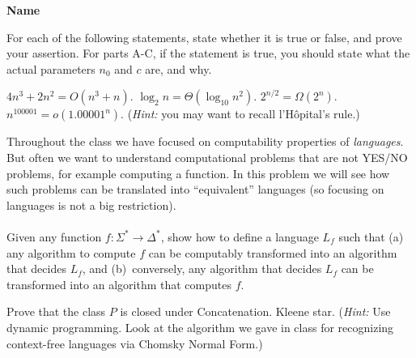 \documentclass[letterpaper, ps]{cs121}
\begin{document}




\vspace{3mm}
\begin{center} \bf{Name} \end{center}


 For each of the following statements, state whether it is true or false, and prove your assertion. 
For parts A-C, if the statement is true, you should state what the actual parameters $n_0$ and $c$ are, and why.

\subproblem $4n^3+2n^2=O(n^3+n)$.
\subproblem $\log_2 n = \Theta(\log_{10} n^2)$.
\subproblem $2^{n/2} = \Omega(2^n)$.
\subproblem $n^{100001}=o(1.00001^n)$. (\emph{Hint:} you may want to recall  l'H\^opital's rule.)


 Throughout the class we have focused on computability
properties of \emph{languages}.  But often we want to understand
computational problems that are not YES/NO problems, for example
computing a function.  In this problem we will see how such
problems can be translated into ``equivalent'' languages (so
focusing on languages is not a big restriction). \\
\\Given any function $f: \Sigma^* \rightarrow
\Delta^*$, show how to define a language $L_f$ such that (a) any
algorithm to compute $f$ can be computably transformed into an
algorithm that decides $L_f$, and (b)~conversely, any algorithm
that decides $L_f$ can be transformed into an algorithm that
computes $f$.


Prove that the class $P$ is closed under
\subproblem Concatenation.
\subproblem Kleene star. (\emph{Hint:} Use dynamic programming.  Look at the algorithm we gave in class for recognizing context-free languages via Chomsky Normal Form.)

\end{document}
